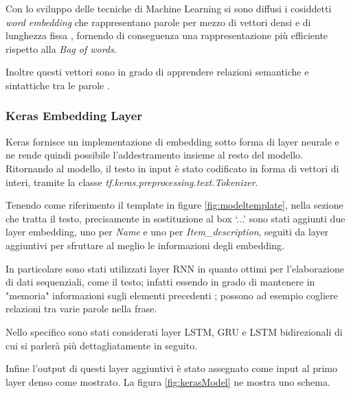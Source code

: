 Con lo sviluppo delle tecniche di Machine Learning si sono diffusi i cosiddetti
\textit{word embedding} che rappresentano parole per mezzo di
vettori densi e di lunghezza fissa \cite{almeida2019word}, fornendo di
conseguenza una rappresentazione più efficiente rispetto alla \textit{Bag of
	words}.

Inoltre questi vettori sono in grado di apprendere relazioni semantiche e
sintattiche tra le parole \cite{mikolov2013efficient}.

\subsubsection{Keras Embedding Layer}

Keras fornisce un implementazione di embedding sotto forma di layer neurale e
ne rende quindi possibile l'addestramento insieme al resto del modello.
\\
Ritornando al modello, il testo in input è stato codificato in forma di
vettori di interi, tramite la classe \textit{tf.keras.preprocessing.\-text.Tokenizer}.

Tenendo come riferimento il template in figure
\ref{fig:modeltemplate}, nella sezione che tratta il testo, precisamente in
sostituzione al box `...' sono stati aggiunti due layer embedding, uno per
\textit{Name} e uno per \textit{Item\_description}, seguiti da layer aggiuntivi
per sfruttare al meglio le informazioni degli embedding.

In particolare sono stati utilizzati layer RNN in quanto ottimi per
l'elaborazione di dati sequenziali, come il testo; infatti essendo in grado di
mantenere in "memoria" informazioni sugli elementi precedenti
\cite{liang2017text}; possono ad esempio cogliere relazioni tra varie parole nella frase.

Nello specifico sono stati considerati layer LSTM, GRU e LSTM bidirezionali di
cui si parlerà più dettagliatamente in seguito.

Infine l'output di questi layer aggiuntivi è stato assegnato come input al primo
layer denso come mostrato. La figura \ref{fig:kerasModel} ne mostra uno schema.


